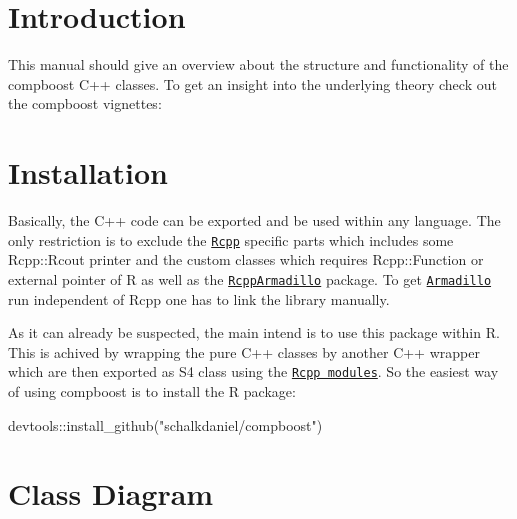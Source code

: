 \hypertarget{index_intro_sec}{}\section{Introduction}\label{index_intro_sec}
This manual should give an overview about the structure and functionality of the {\ttfamily compboost} {\ttfamily C++} classes. To get an insight into the underlying theory check out the {\ttfamily compboost} vignettes\+:\hypertarget{index_install_sec}{}\section{Installation}\label{index_install_sec}
Basically, the {\ttfamily C++} code can be exported and be used within any language. The only restriction is to exclude the \href{https://cran.r-project.org/web/packages/Rcpp/vignettes/Rcpp-introduction.pdf}{\tt {\ttfamily Rcpp}} specific parts which includes some {\ttfamily Rcpp\+::\+Rcout} printer and the custom classes which requires {\ttfamily Rcpp\+::\+Function} or external pointer of {\ttfamily R} as well as the \href{https://cran.r-project.org/web/packages/RcppArmadillo/vignettes/RcppArmadillo-intro.pdf}{\tt {\ttfamily Rcpp\+Armadillo}} package. To get \href{http://arma.sourceforge.net}{\tt {\ttfamily Armadillo}} run independent of {\ttfamily Rcpp} one has to link the library manually.

As it can already be suspected, the main intend is to use this package within {\ttfamily R}. This is achived by wrapping the pure {\ttfamily C++} classes by another {\ttfamily C++} wrapper which are then exported as {\ttfamily S4} class using the \href{https://cran.r-project.org/web/packages/Rcpp/vignettes/Rcpp-modules.pdf}{\tt Rcpp modules}. So the easiest way of using {\ttfamily compboost} is to install the {\ttfamily R} package\+:


\begin{DoxyCode}
devtools::install\_github(\textcolor{stringliteral}{"schalkdaniel/compboost"})
\end{DoxyCode}
\hypertarget{index_class_diagram}{}\section{Class Diagram}\label{index_class_diagram}
 